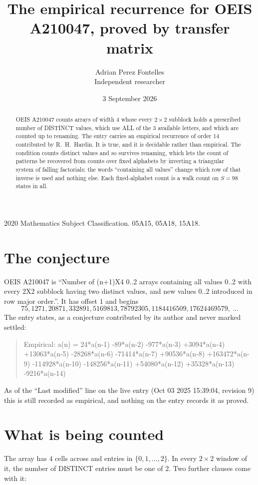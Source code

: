 \documentclass[11pt,a4paper]{article}
\title{The empirical recurrence for OEIS A210047, proved by transfer matrix}
\author{Adrian Perez Fontelles\\ \small Independent researcher}
\date{3 September 2026}
\theoremstyle{plain}
\theoremstyle{definition}
\begin{document}
\maketitle

\begin{abstract}
OEIS A210047 counts arrays of width $4$ whose every $2\times2$ subblock holds a
prescribed number of DISTINCT values, which use ALL of the $3$ available letters, and which
are counted up to renaming. The entry carries an empirical recurrence of order $14$
contributed by R.~H.~Hardin. It is true, and it is decidable rather than empirical. The
condition counts distinct values and so survives renaming, which lets the count of patterns be
recovered from counts over fixed alphabets by inverting a triangular system of falling
factorials; the words ``containing all values'' change which row of that inverse is used and
nothing else. Each fixed-alphabet count is a walk count on $S=98$ states in all.
\end{abstract}

\noindent\small 2020 Mathematics Subject Classification. 05A15, 05A18, 15A18.\normalsize

\section{The conjecture}

OEIS A210047 is ``Number of (n+1)X4 0..2 arrays containing all values 0..2 with every 2X2 subblock having two distinct values, and new values 0..2 introduced in row major order.''. It has offset $1$ and begins
\[
75, 1271, 20871, 332891, 5169813, 78792305, 1184416509, 17624469579,\ \dots
\]
The entry states, as a conjecture contributed by its author and never marked settled:
\begin{quote}
Empirical: a(n) = 24*a(n-1) -89*a(n-2) -977*a(n-3) +3094*a(n-4) +13063*a(n-5) -28268*a(n-6) -71414*a(n-7) +90536*a(n-8) +163472*a(n-9) -114928*a(n-10) -148256*a(n-11) +54080*a(n-12) +35328*a(n-13) -9216*a(n-14)
\end{quote}
As of the ``Last modified'' line on the live entry (Oct 03 2025 15:39:04, revision 9) this is still
recorded as empirical, and nothing on the entry records it as proved.

\section{What is being counted}

The array has $4$ cells across and entries in $\{0,1,\dots,2\}$. In every
$2\times2$ window of it, the number of DISTINCT entries must be one of $2$. Two
further clauses come with it:
\end{document}
